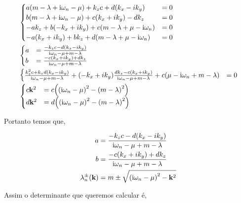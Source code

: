 \documentclass[twoside]{amsart}
\numberwithin{equation}{section}
\begin{document}
\begin{align}
    &\begin{cases}
        a\qty(m-\lambda+\textnormal{i}\omega_n-\mu)+k_z c+d\qty(k_x-ik_y)&=0\\
        b\qty(m-\lambda+\textnormal{i}\omega_n-\mu)+c\qty(k_x+ik_y)-dk_z&=0\\
        -ak_z+b\qty(-k_x+ik_y)+c\qty(m-\lambda+\mu-\textnormal{i}\omega_n)&=0\\
        -a\qty(k_x+ik_y)+bk_z+d\qty(m-\lambda+\mu-\textnormal{i}\omega_n)&=0
    \end{cases}\\
    &\begin{cases}
        a&=\frac{-k_zc-d\qty(k_x-ik_y)}{\textnormal{i}\omega_n-\mu+m-\lambda}\\
        b&=\frac{-c\qty(k_x+ik_y)+dk_z}{\textnormal{i}\omega_n-\mu+m-\lambda}
    \end{cases}\\
    &\begin{cases}
        \frac{k_z^2c+k_zd\qty(k_x-ik_y)}{\textnormal{i}\omega_n-\mu+m-\lambda}+\qty(-k_x+ik_y)\frac{dk_z-c\qty(k_x+ik_y)}{\textnormal{i}\omega_n-\mu+m-\lambda}+c\qty(\mu-\textnormal{i}\omega_n+m-\lambda)&=0
    \end{cases}\\
    &\begin{cases}
        c\vb k^2&=c\qty(\qty(\textnormal{i}\omega_n-\mu)^2-\qty(m-\lambda)^2)\\
        d\vb k^2&=d\qty(\qty(\textnormal{i}\omega_n-\mu)^2-\qty(m-\lambda)^2)
    \end{cases}
\end{align}

Portanto temos que,

\begin{align}
    a&=\frac{-k_zc-d\qty(k_x-ik_y)}{\textnormal{i}\omega_n-\mu+m-\lambda}\\
    b&=\frac{-c\qty(k_x+ik_y)+dk_z}{\textnormal{i}\omega_n-\mu+m-\lambda}\\
    \lambda_n^\pm\qty(\vb k)&=m\pm\sqrt{\qty(\textnormal{i}\omega_n-\mu)^2-\vb k^2}
\end{align}

Assim o determinante que queremos calcular é,
\end{document}
